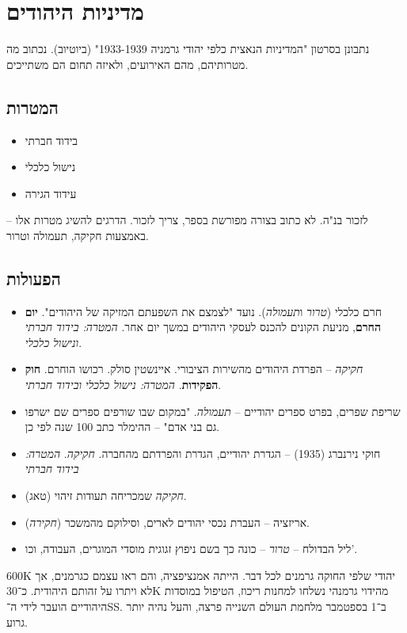 \documentclass[a4paper]{book}
\begin{document}
	
	
	\section{מדיניות היהודים}
	נתבונן בסרטון "המדיניות הנאצית כלפי יהודי גרמניה 1933-1939" (ביוטיוב). נכתוב מה מטרותיהם, מהם האירועים, ולאיזה תחום הם משתייכים. 
	\subsection{המטרות}
	\begin{itemize}
		\item בידוד חברתי
		\item נישול כלכלי
		\item עידוד הגירה
	\end{itemize}
	לזכור בנ"ה. לא כתוב בצורה מפורשת בספר, צריך לזכור. הדרגים להשיג מטרות אלו – באמצעות חקיקה, תעמולה וטרור. 
	\subsection{הפעולות}
	\begin{itemize}
		\item חרם כלכלי (\textit{טרור} ו\textit{תעמולה}). נועד "לצמצם את השפעתם המזיקה של היהודים". \textbf{יום החרם}, מניעת הקונים להכנס לעסקי היהודים במשך יום אחר. \textit{המטרה: בידוד חברתי ונישול כלכלי}. 
		\item \textit{חקיקה} – הפרדת היהודים מהשירות הציבורי. איינשטין סולק. רכושו הוחרם. \textbf{חוק הפקידות}. \textit{המטרה: נישול כלכלי ובידוד חברתי}. 
		\item שריפת שפרים, בפרט ספרים יהודיים – \textit{תעמולה}. "במקום שבו שורפים ספרים שם ישרפו גם בני אדם" – ההימלר כתב 100 שנה לפי כן. 
		\item חוקי נירנברג (1935) – הגדרת יהודיים, הגדרת והפרדתם מהחברה. \textit{חקיקה}. \textit{המטרה: בידוד חברתי
		}
		\item \textit{חקיקה} שמכריחה תעודות זיהוי (טאג). 
		\item אריזציה – העברת נכסי יהודים לארים, וסילוקם מהמשכר (\textit{חקירה}). 
		\item ליל הבדולח – \textit{טרור} – כונה כך בשם ניפוץ זגוגית מוסדי המוגרים, העבודה, וכו'. 
	\end{itemize}
	600K יהודי שלפי החוקה גרמנים לכל דבר. הייתה אמנציפציה, והם ראו עצמם כגרמנים, אך לא ויתרו על זהותם היהודית. כ־30K מהידוי גרמנהי נשלחו למחנות ריכוז, הטיפול במוסדות היהודיים הועבר לידי ה־SS. ב־1 בספטמבר מלחמת העולם השנייה פרצה, והעל נהיה יותר גרוע. 
	
\end{document}
